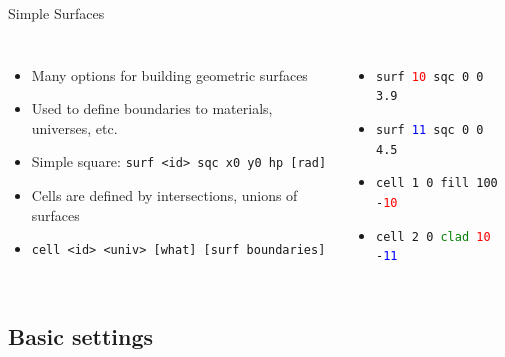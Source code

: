 \documentclass{beamer}
\begin{document}
\begin{frame}{Simple Surfaces}
    \begin{columns}
        \begin{itemize}
            \item{Many options for building geometric surfaces}
            \item{Used to define boundaries to materials, universes, etc.}
            \item{Simple square: \texttt{surf <id> sqc x0 y0 hp [rad]}}
            \item{Cells are defined by intersections, unions of surfaces}
            \item{\texttt{cell <id> <univ> [what] [surf boundaries]}}
        \end{itemize}
        \begin{itemize}
            \onslide
            \item{\texttt{surf \textcolor{red}{10} sqc 0 0 3.9}}
            \item{\texttt{surf \textcolor{blue}{11} sqc 0 0 4.5}}
            \item{\texttt{cell 1 0 fill 100 -\textcolor{red}{10}}}
            \item{\texttt{cell 2 0 \textcolor{green}{clad} \textcolor{red}{10} -\textcolor{blue}{11}}}
        \end{itemize}
    \end{columns}
\end{frame}

\subsection{Basic settings}
\end{document}
